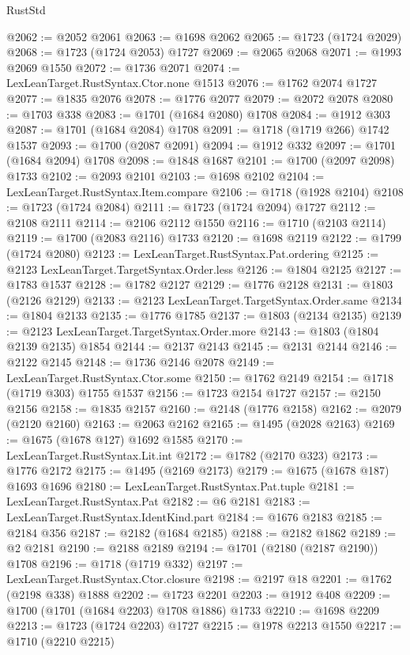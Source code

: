 \begin{lexlean}{RustStd}
\begin{coremodule}
@2062 := @2052 @2061
@2063 := @1698 @2062
@2065 := @1723 (@1724 @2029)
@2068 := @1723 (@1724 @2053) @1727
@2069 := @2065 @2068
@2071 := @1993 @2069 @1550
@2072 := @1736 @2071
@2074 := LexLeanTarget.RustSyntax.Ctor.none @1513
@2076 := @1762 @2074 @1727
@2077 := @1835 @2076
@2078 := @1776 @2077
@2079 := @2072 @2078
@2080 := @1703 @338
@2083 := @1701 (@1684 @2080) @1708
@2084 := @1912 @303
@2087 := @1701 (@1684 @2084) @1708
@2091 := @1718 (@1719 @266) @1742 @1537
@2093 := @1700 (@2087 @2091)
@2094 := @1912 @332
@2097 := @1701 (@1684 @2094) @1708
@2098 := @1848 @1687
@2101 := @1700 (@2097 @2098) @1733
@2102 := @2093 @2101
@2103 := @1698 @2102
@2104 := LexLeanTarget.RustSyntax.Item.compare
@2106 := @1718 (@1928 @2104)
@2108 := @1723 (@1724 @2084)
@2111 := @1723 (@1724 @2094) @1727
@2112 := @2108 @2111
@2114 := @2106 @2112 @1550
@2116 := @1710 (@2103 @2114)
@2119 := @1700 (@2083 @2116) @1733
@2120 := @1698 @2119
@2122 := @1799 (@1724 @2080)
@2123 := LexLeanTarget.RustSyntax.Pat.ordering
@2125 := @2123 LexLeanTarget.TargetSyntax.Order.less
@2126 := @1804 @2125
@2127 := @1783 @1537
@2128 := @1782 @2127
@2129 := @1776 @2128
@2131 := @1803 (@2126 @2129)
@2133 := @2123 LexLeanTarget.TargetSyntax.Order.same
@2134 := @1804 @2133
@2135 := @1776 @1785
@2137 := @1803 (@2134 @2135)
@2139 := @2123 LexLeanTarget.TargetSyntax.Order.more
@2143 := @1803 (@1804 @2139 @2135) @1854
@2144 := @2137 @2143
@2145 := @2131 @2144
@2146 := @2122 @2145
@2148 := @1736 @2146 @2078
@2149 := LexLeanTarget.RustSyntax.Ctor.some
@2150 := @1762 @2149
@2154 := @1718 (@1719 @303) @1755 @1537
@2156 := @1723 @2154 @1727
@2157 := @2150 @2156
@2158 := @1835 @2157
@2160 := @2148 (@1776 @2158)
@2162 := @2079 (@2120 @2160)
@2163 := @2063 @2162
@2165 := @1495 (@2028 @2163)
@2169 := @1675 (@1678 @127) @1692 @1585
@2170 := LexLeanTarget.RustSyntax.Lit.int
@2172 := @1782 (@2170 @323)
@2173 := @1776 @2172
@2175 := @1495 (@2169 @2173)
@2179 := @1675 (@1678 @187) @1693 @1696
@2180 := LexLeanTarget.RustSyntax.Pat.tuple
@2181 := LexLeanTarget.RustSyntax.Pat
@2182 := @6 @2181
@2183 := LexLeanTarget.RustSyntax.IdentKind.part
@2184 := @1676 @2183
@2185 := @2184 @356
@2187 := @2182 (@1684 @2185)
@2188 := @2182 @1862
@2189 := @2 @2181
@2190 := @2188 @2189
@2194 := @1701 (@2180 (@2187 @2190)) @1708
@2196 := @1718 (@1719 @332)
@2197 := LexLeanTarget.RustSyntax.Ctor.closure
@2198 := @2197 @18
@2201 := @1762 (@2198 @338) @1888
@2202 := @1723 @2201
@2203 := @1912 @408
@2209 := @1700 (@1701 (@1684 @2203) @1708 @1886) @1733
@2210 := @1698 @2209
@2213 := @1723 (@1724 @2203) @1727
@2215 := @1978 @2213 @1550
@2217 := @1710 (@2210 @2215)

\end{coremodule}
\end{lexlean}
